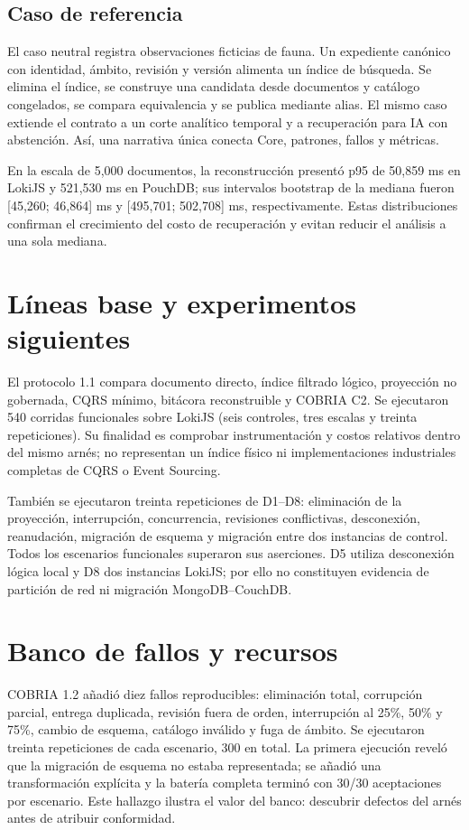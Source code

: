 \documentclass[11pt]{article}
\begin{document}
\subsection{Caso de referencia}
El caso neutral registra observaciones ficticias de fauna. Un expediente canónico con identidad, ámbito, revisión y versión alimenta un índice de búsqueda. Se elimina el índice, se construye una candidata desde documentos y catálogo congelados, se compara equivalencia y se publica mediante alias. El mismo caso extiende el contrato a un corte analítico temporal y a recuperación para IA con abstención. Así, una narrativa única conecta Core, patrones, fallos y métricas.

En la escala de 5,000 documentos, la reconstrucción presentó p95 de 50,859 ms en LokiJS y 521,530 ms en PouchDB; sus intervalos bootstrap de la mediana fueron [45,260; 46,864] ms y [495,701; 502,708] ms, respectivamente. Estas distribuciones confirman el crecimiento del costo de recuperación y evitan reducir el análisis a una sola mediana.

\section{Líneas base y experimentos siguientes}
El protocolo 1.1 compara documento directo, índice filtrado lógico, proyección no gobernada, CQRS mínimo, bitácora reconstruible y COBRIA C2. Se ejecutaron 540 corridas funcionales sobre LokiJS (seis controles, tres escalas y treinta repeticiones). Su finalidad es comprobar instrumentación y costos relativos dentro del mismo arnés; no representan un índice físico ni implementaciones industriales completas de CQRS o Event Sourcing.

También se ejecutaron treinta repeticiones de D1--D8: eliminación de la proyección, interrupción, concurrencia, revisiones conflictivas, desconexión, reanudación, migración de esquema y migración entre dos instancias de control. Todos los escenarios funcionales superaron sus aserciones. D5 utiliza desconexión lógica local y D8 dos instancias LokiJS; por ello no constituyen evidencia de partición de red ni migración MongoDB--CouchDB.

\section{Banco de fallos y recursos}
COBRIA 1.2 añadió diez fallos reproducibles: eliminación total, corrupción parcial, entrega duplicada, revisión fuera de orden, interrupción al 25\%, 50\% y 75\%, cambio de esquema, catálogo inválido y fuga de ámbito. Se ejecutaron treinta repeticiones de cada escenario, 300 en total. La primera ejecución reveló que la migración de esquema no estaba representada; se añadió una transformación explícita y la batería completa terminó con 30/30 aceptaciones por escenario. Este hallazgo ilustra el valor del banco: descubrir defectos del arnés antes de atribuir conformidad.
\end{document}
